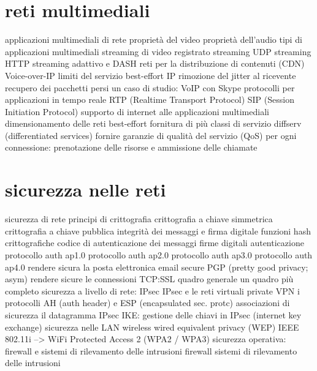     \section{reti multimediali}
        applicazioni multimediali di rete
            proprietà del video
            proprietà dell'audio
            tipi di applicazioni multimediali
        streaming di video registrato
            streaming UDP
            streaming HTTP
            streaming adattivo e DASH
            reti per la distribuzione di contenuti (CDN)
        Voice-over-IP
            limiti del servizio best-effort IP
            rimozione del jitter al ricevente
            recupero dei pacchetti persi
            un caso di studio: VoIP con Skype
        protocolli per applicazioni in tempo reale
            RTP (Realtime Transport Protocol)
            SIP (Session Initiation Protocol)
        supporto di internet alle applicazioni multimediali
            dimensionamento delle reti best-effort
            fornitura di più classi di servizio
            diffserv (differentiated services)
            fornire garanzie di qualità del servizio (QoS) per ogni connessione: prenotazione delle risorse e ammissione delle chiamate
    \section{sicurezza nelle reti}
        sicurezza di rete
        principi di crittografia
            crittografia a chiave simmetrica
            crittografia a chiave pubblica
        integrità dei messaggi e firma digitale
            funzioni hash crittografiche
            codice di autenticazione dei messaggi
            firme digitali
        autenticazione
            protocollo auth ap1.0
            protocollo auth ap2.0
            protocollo auth ap3.0
            protocollo auth ap4.0
        rendere sicura la posta elettronica
            email secure
            PGP (pretty good privacy; asym)
        rendere sicure le connessioni TCP:SSL
            quadro generale
            un quadro più completo
        sicurezza a livello di rete: IPsec
            IPsec e le reti virtuali private VPN
            i protocolli AH (auth header) e ESP (encapsulated sec. protc)
            associazioni di sicurezza
            il datagramma IPsec
            IKE: gestione delle chiavi in IPsec (internet key exchange)
        sicurezza nelle LAN wireless
            wired equivalent privacy (WEP)
            IEEE 802.11i --> WiFi Protected Access 2 (WPA2 / WPA3)
        sicurezza operativa: firewall e sistemi di rilevamento delle intrusioni
            firewall
            sistemi di rilevamento delle intrusioni
